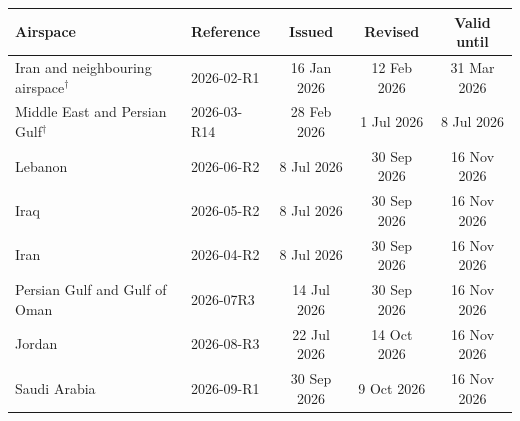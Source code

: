 \begin{tabular}{@{}llccc@{}}\toprule
Airspace & Reference & Issued & Revised & Valid until\\\midrule
Iran and neighbouring airspace$^\dagger$ & 2026-02-R1 & 16 Jan 2026 & 12 Feb 2026 & 31 Mar 2026\\
Middle East and Persian Gulf$^\dagger$ & 2026-03-R14 & 28 Feb 2026 & 1 Jul 2026 & 8 Jul 2026\\
Lebanon & 2026-06-R2 & 8 Jul 2026 & 30 Sep 2026 & 16 Nov 2026\\
Iraq & 2026-05-R2 & 8 Jul 2026 & 30 Sep 2026 & 16 Nov 2026\\
Iran & 2026-04-R2 & 8 Jul 2026 & 30 Sep 2026 & 16 Nov 2026\\
Persian Gulf and Gulf of Oman & 2026-07R3 & 14 Jul 2026 & 30 Sep 2026 & 16 Nov 2026\\
Jordan & 2026-08-R3 & 22 Jul 2026 & 14 Oct 2026 & 16 Nov 2026\\
Saudi Arabia & 2026-09-R1 & 30 Sep 2026 & 9 Oct 2026 & 16 Nov 2026\\
\bottomrule\end{tabular}